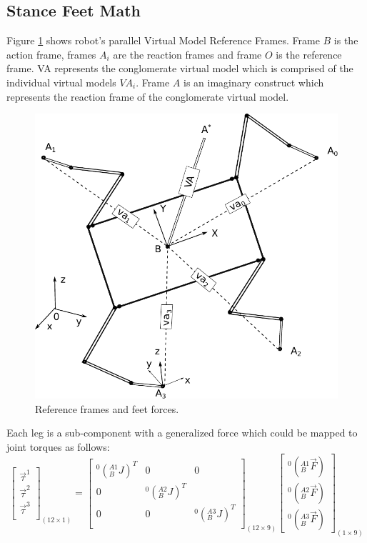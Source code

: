 \documentclass[]{article}
\begin{document}
\subsection{Stance Feet Math}
Figure \ref{fig:guaravirtualactuators} shows robot's  parallel Virtual Model Reference Frames. Frame $B$ is the action frame, frames $A_i$ 
are the reaction frames and frame $O$ is the reference frame. VA represents the conglomerate virtual model which is comprised of the individual virtual models $VA_i$. Frame $A$ is an imaginary construct which represents the reaction frame of the conglomerate virtual model.
\begin{figure}%
	\centering
	\includegraphics[scale=0.4]{"Figuras/GuaraVirtualActuators"}
	\caption{Reference frames and feet forces.}
	\label{fig:guaravirtualactuators}
\end{figure}
Each leg is a sub-component with a generalized force which could be mapped to joint torques as follows:
\begin{equation}
\begin{bmatrix}
	\vec{\tau}^1 \\
	\vec{\tau}^2 \\
	\vec{\tau}^3 \\
\end{bmatrix}_{(12\times1)}
=
\begin{bmatrix}
	^0(_B^{A1}J)^T  & 0 				& 0  				\\ 
		0  			& ^0(_B^{A2}J)^T 	&   				\\ 
		0 			& 0 				&^0(_B^{A3}J)^T 	\\ 
\end{bmatrix}_{(12 \times 9)}
\begin{bmatrix}
	^0(_B^{A1}\vec{F}) 	\\
	^0(_B^{A2}\vec{F}) 	\\
	^0(_B^{A3}\vec{F})
\end{bmatrix}_{(1 \times 9)}
\label{eq:parallelVirtualModelEquation}
\end{equation}
\end{document}

